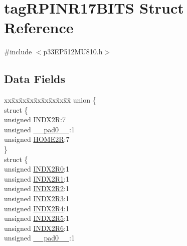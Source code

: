 \hypertarget{structtag_r_p_i_n_r17_b_i_t_s}{}\section{tag\+R\+P\+I\+N\+R17\+B\+I\+TS Struct Reference}
\label{structtag_r_p_i_n_r17_b_i_t_s}


{\ttfamily \#include $<$p33\+E\+P512\+M\+U810.\+h$>$}

\subsection*{Data Fields}
\begin{DoxyCompactItemize}
\item 
\begin{tabbing}
xx\=xx\=xx\=xx\=xx\=xx\=xx\=xx\=xx\=\kill
union \{\\
\>struct \{\\
\>\>unsigned \hyperlink{structtag_r_p_i_n_r17_b_i_t_s_ac17510a8829565c85b1d28402e47953e}{INDX2R}:7\\
\>\>unsigned \hyperlink{structtag_r_p_i_n_r17_b_i_t_s_adf71f3d8410c1f1dbbc96680a92c49af}{\_\_pad0\_\_}:1\\
\>\>unsigned \hyperlink{structtag_r_p_i_n_r17_b_i_t_s_aeaa3df16503dde270f2588a65636911e}{HOME2R}:7\\
\>\} \\
\>struct \{\\
\>\>unsigned \hyperlink{structtag_r_p_i_n_r17_b_i_t_s_ad82bdbc8da26f1419dcb9f8b9da74519}{INDX2R0}:1\\
\>\>unsigned \hyperlink{structtag_r_p_i_n_r17_b_i_t_s_a09e643c08f083e37170e540e088341f8}{INDX2R1}:1\\
\>\>unsigned \hyperlink{structtag_r_p_i_n_r17_b_i_t_s_a0541fe06f87b3769bf9d587a7aacec53}{INDX2R2}:1\\
\>\>unsigned \hyperlink{structtag_r_p_i_n_r17_b_i_t_s_a04d1ab27a6b848c87edf8cf7b7a8e1bf}{INDX2R3}:1\\
\>\>unsigned \hyperlink{structtag_r_p_i_n_r17_b_i_t_s_aefd63bcbd1e2c6fb2dd5b320c945a3fc}{INDX2R4}:1\\
\>\>unsigned \hyperlink{structtag_r_p_i_n_r17_b_i_t_s_a06018af6abae2f63eed086bae8a01040}{INDX2R5}:1\\
\>\>unsigned \hyperlink{structtag_r_p_i_n_r17_b_i_t_s_a2011773e36124b796571a625c6231ec8}{INDX2R6}:1\\
\>\>unsigned \hyperlink{structtag_r_p_i_n_r17_b_i_t_s_adf71f3d8410c1f1dbbc96680a92c49af}{\_\_pad0\_\_}:1\\

\end{tabbing}
\end{DoxyCompactItemize}

